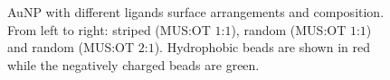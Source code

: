 \begin{figure}[!ht]
	\centering
	\qquad
	\qquad
	\caption{Au\acs{NP} with different ligands surface arrangements and composition. From left to right: striped (\ac{MUS}:\ac{OT} $1$:$1$), random (\ac{MUS}:\ac{OT} $1$:$1$) and random (\ac{MUS}:\ac{OT} $2$:$1$). Hydrophobic beads are shown in red while the negatively charged beads are green.}
	\label{fig:coating}
\end{figure}


